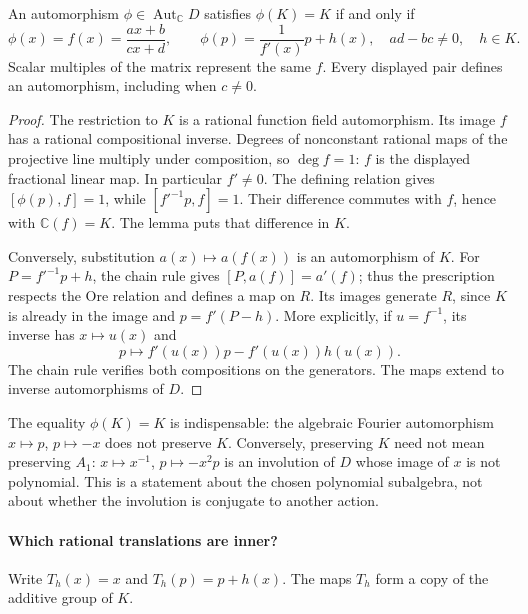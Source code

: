 \begin{proposition}
An automorphism \(\phi\in\operatorname{Aut}_{\mathbb C}D\) satisfies
\(\phi(K)=K\) if and only if
\[
 \phi(x)=f(x)=\frac{ax+b}{cx+d},\qquad
 \phi(p)=\frac{1}{f'(x)}p+h(x),
 \quad ad-bc\ne0,\quad h\in K.
\]
Scalar multiples of the matrix represent the same \(f\). Every displayed pair
defines an automorphism, including when \(c\ne0\).
\end{proposition}
\begin{proof}
The restriction to \(K\) is a rational function field automorphism. Its image
\(f\) has a rational compositional inverse. Degrees of nonconstant rational
maps of the projective line multiply under composition, so \(\deg f=1\):
\(f\) is the displayed fractional linear map. In particular \(f'\ne0\).
The defining relation gives \([\phi(p),f]=1\), while
\([f'^{-1}p,f]=1\). Their difference commutes with \(f\), hence with
\(\mathbb C(f)=K\). The lemma puts that difference in \(K\).

Conversely, substitution \(a(x)\mapsto a(f(x))\) is an automorphism of \(K\).
For \(P=f'^{-1}p+h\), the chain rule gives
\([P,a(f)]=a'(f)\); thus the prescription respects the Ore relation and
defines a map on \(R\). Its images generate \(R\), since \(K\) is already
in the image and \(p=f'(P-h)\). More explicitly, if \(u=f^{-1}\), its inverse
has \(x\mapsto u(x)\) and
\[
 p\mapsto f'(u(x))p-f'(u(x))h(u(x)).
\]
The chain rule verifies both compositions on the generators. The maps extend
to inverse automorphisms of \(D\).
\end{proof}

The equality \(\phi(K)=K\) is indispensable: the algebraic Fourier
automorphism \(x\mapsto p\), \(p\mapsto-x\) does not preserve \(K\).
Conversely, preserving \(K\) need not mean preserving \(A_1\):
\(x\mapsto x^{-1}\), \(p\mapsto-x^2p\) is an involution of \(D\) whose image
of \(x\) is not polynomial. This is a statement about the chosen polynomial
subalgebra, not about whether the involution is conjugate to another action.

\paragraph{Which rational translations are inner?}
Write \(T_h(x)=x\) and \(T_h(p)=p+h(x)\).
The maps \(T_h\) form a copy of the additive group of \(K\).

